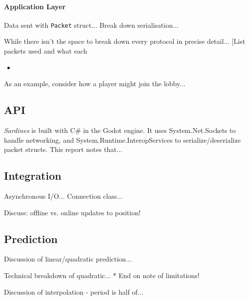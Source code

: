\documentclass[a4paper, 11pt]{article}
\begin{document}
\begin{flushleft}
\paragraph{Application Layer}

Data sent with \texttt{Packet} struct...
Break down serialisation...

\vspace{5pt}\noindent
While there isn't the space to break down every protocol in precise detail... [List packets used and what each 
\begin{itemize}
\item
\end{itemize}

\vspace{5pt}\noindent
As an example, consider how a player might join the lobby...

\subsection*{API}

\textit{Sardines} is built with C\# in the Godot engine. It uses System.Net.Sockets to handle networking, and System.Runtime.InteropServices to serialize/deserialize packet structs. This report notes that...



\subsection*{Integration}

Asynchronous I/O...
Connection class...

\vspace{5pt}\noindent
Discuss: offline vs. online updates to position!

\subsection*{Prediction}

Discussion of linear/quadratic prediction...


\vspace{5pt}\noindent
Technical breakdown of quadratic...
* End on note of limitations!

\vspace{5pt}\noindent
Discussion of interpolation - period is half of...

\vspace{5pt}


\end{flushleft}
\end{document}
